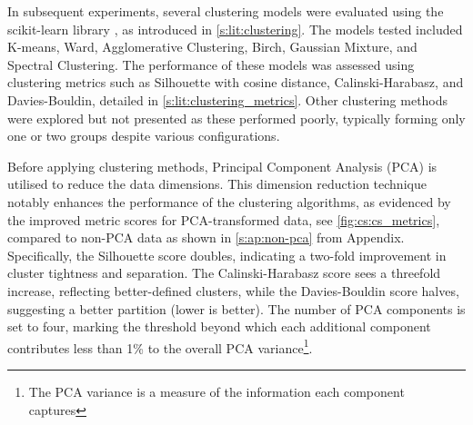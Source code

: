 In subsequent experiments, several clustering models were evaluated using the scikit-learn library \cite{Scikit-learn_undated-ax}, as introduced in \cref{s:lit:clustering}. The models tested included K-means, Ward, Agglomerative Clustering, Birch, Gaussian Mixture, and Spectral Clustering. The performance of these models was assessed using clustering metrics such as Silhouette with cosine distance, Calinski-Harabasz, and Davies-Bouldin, detailed in \cref{s:lit:clustering_metrics}. Other clustering methods were explored but not presented as these performed poorly, typically forming only one or two groups despite various configurations.


Before applying clustering methods, Principal Component Analysis (PCA) is utilised to reduce the data dimensions. This dimension reduction technique notably enhances the performance of the clustering algorithms, as evidenced by the improved metric scores for PCA-transformed data, see  \cref{fig:cs:cs_metrics}, compared to non-PCA data as shown in \cref{s:ap:non-pca} from Appendix. Specifically, the Silhouette score doubles, indicating a two-fold improvement in cluster tightness and separation. The Calinski-Harabasz score sees a threefold increase, reflecting better-defined clusters, while the Davies-Bouldin score halves, suggesting a better partition (lower is better). The number of PCA components is set to four, marking the threshold beyond which each additional component contributes less than 1\% to the overall PCA variance\footnote{The PCA variance is a measure of the information each component captures}.

